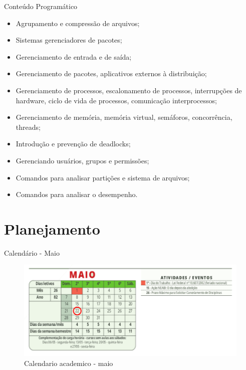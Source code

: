 \documentclass{beamer}
\begin{document}
\begin{frame}[fragile]{Conteúdo Programático}

      \begin{itemize}
            \item Agrupamento e compressão de arquivos;
            \item Sistemas gerenciadores de pacotes;
            \item Gerenciamento de entrada e de saída;
            \item Gerenciamento de pacotes, aplicativos externos à distribuição;
            \item Gerenciamento de processos, escalonamento de processos, interrupções de
            hardware, ciclo de vida de processos, comunicação interprocessos;
            \item Gerenciamento de memória, memória virtual, semáforos, concorrência, threads;
            \item Introdução e prevenção de deadlocks;
            \item Gerenciando usuários, grupos e permissões;
            \item Comandos para analisar partições e sistema de arquivos;
            \item Comandos para analisar o desempenho.
      \end{itemize}
      \end{frame}
      



\section{Planejamento}


\begin{frame}[fragile]{Calendário - Maio}
      \begin{figure}[H]
            \centerline{\includegraphics[width=1.1\textwidth]{assets/aula-tads-sopa2-2023-05-22/maio.png}}
            \caption{Calendario academico - maio}
        \end{figure}
\end{frame}
\end{document}
